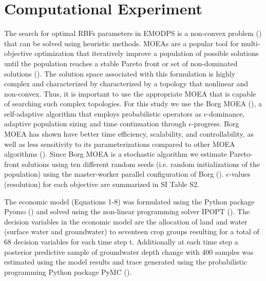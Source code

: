 \documentclass[a4paper,fleqn]{cas-sc}
\begin{document}
\section{Computational Experiment}

The search for  optimal RBFs parameters in EMODPS is a non-convex problem (\cite{giuliani_curses_2016}) that can be solved using heuristic methods. MOEAs are a popular tool for multi-objective optimization that iteratively improve a population of possible solutions  until the population reaches a stable Pareto front or set of  non-dominated solutions (\cite{coello_evolutionary_2007}). The solution space associated with this formulation is highly complex and characterized by characterized by a topology that nonlinear and non-convex. Thus, it is important to use the appropriate MOEA that is capable of searching such complex topologies. For this study we use the Borg MOEA (\cite{hadka_borg_2013}), a self-adaptive algorithm that employs probabilistic operators as $\epsilon$-dominance, adaptive population sizing and time continuation through $\epsilon$-progress. Borg MOEA has shown have better time efficiency, scalability, and controllability, as well as less sensitivity to its parameterizations compared to other MOEA algorithms (\cite{reed_evolutionary_2013,gupta_can_2020,zatarain_salazar_balancing_2017}). Since Borg MOEA is a stochastic algorithm we estimate Pareto-front solutions using ten different random seeds (i.e.  random initializations of the population) using the master-worker parallel configuration of Borg (\cite{hadka_large-scale_2015}). $\epsilon$-values (resolution) for each objective are summarized in SI Table S2. 


The economic model (Equations 1-8) was formulated using the Python package Pyomo (\cite{hart_pyomo_2011}) and solved using the non-linear programming solver IPOPT (\cite{wachter_implementation_2006}). The decision variables in the economic model are the allocation of land and water (surface water and groundwater) to seventeen crop groups resulting for a total of 68 decision variables for each time step t. Additionally at each time step a posterior predictive sample of groundwater depth change with 400 samples was estimated using the model results and trace generated using the probabilistic programming Python package PyMC  (\cite{salvatier_probabilistic_2016}).
\end{document}
